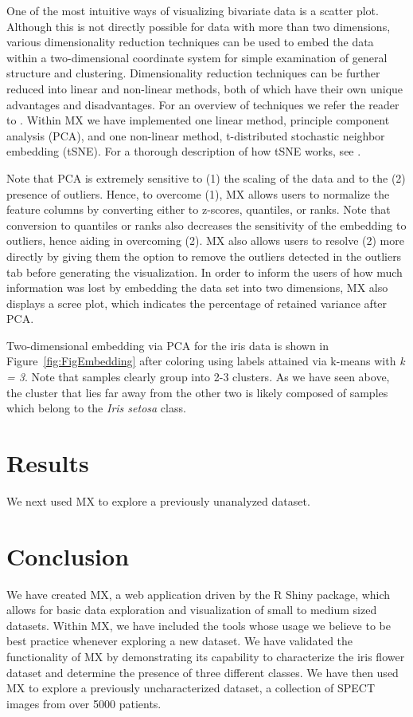 \documentclass[12pt]{article}
\begin{document}
One of the most intuitive ways of visualizing bivariate data is a scatter plot. Although this is not directly possible for data with more than two dimensions, various dimensionality reduction techniques can be used to embed the data within a two-dimensional coordinate system for simple examination of general structure and clustering. Dimensionality reduction techniques can be further reduced into linear and non-linear methods, both of which have their own unique advantages and disadvantages. For an overview of techniques we refer the reader to \cite{van2009dimensionality}. Within MX we have implemented one linear method, principle component analysis (PCA), and one non-linear method, t-distributed stochastic neighbor embedding (tSNE). For a thorough description of how tSNE works, see \cite{van2008visualizing}.

Note that PCA is extremely sensitive to (1) the scaling of the data and to the (2) presence of outliers.  Hence, to overcome (1), MX allows users to normalize the feature columns by converting either to z-scores, quantiles, or ranks. Note that conversion to quantiles or ranks also decreases the sensitivity of the embedding to outliers, hence aiding in overcoming (2). MX also allows users to resolve (2) more directly by giving them the option to remove the outliers detected in the outliers tab before generating the visualization. In order to inform the users of how much information was lost by embedding the data set into two dimensions, MX also displays a scree plot, which indicates the percentage of retained variance after PCA. 

Two-dimensional embedding via PCA for the iris data is shown in Figure~\ref{fig:FigEmbedding} after coloring using labels attained via k-means with \textit{k = 3}. Note that samples clearly group into 2-3 clusters. As we have seen above, the cluster that lies far away from the other two is likely composed of samples which belong to the \textit{Iris setosa} class.

\section{Results}
\label{sec:res}
We next used MX to explore a previously unanalyzed dataset.

\section{Conclusion}
\label{sec:conc}

We have created MX, a web application driven by the R Shiny package, which allows for basic data exploration and visualization of small to medium sized datasets. Within MX, we have included the tools whose usage we believe to be best practice whenever exploring a new dataset. We have validated the functionality of MX by demonstrating its capability to characterize the iris flower dataset and determine the presence of three different classes. We have then used MX to explore a previously uncharacterized dataset, a collection of SPECT images from over 5000 patients.
\end{document}

